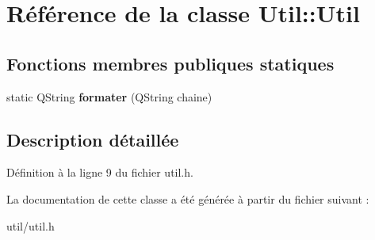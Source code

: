 \hypertarget{class_util_1_1_util}{
\section{Référence de la classe Util::Util}
\label{d3/da9/class_util_1_1_util}
}
\subsection*{Fonctions membres publiques statiques}
\begin{DoxyCompactItemize}
\item 
\hypertarget{class_util_1_1_util_aad80f5682d46393ae780be5c2aa64cc0}{
static QString {\bfseries formater} (QString chaine)}
\label{d3/da9/class_util_1_1_util_aad80f5682d46393ae780be5c2aa64cc0}

\end{DoxyCompactItemize}


\subsection{Description détaillée}


Définition à la ligne 9 du fichier util.h.



La documentation de cette classe a été générée à partir du fichier suivant :\begin{DoxyCompactItemize}
\item 
util/util.h\end{DoxyCompactItemize}
